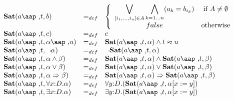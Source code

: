 \documentclass{article}
\def\dbigwedge{\mathop{\displaystyle \bigwedge }}%
\def\dbigvee{\mathop{\displaystyle \bigvee }}%
\begin{document}
\begin{equation*}
\begin{array}{lll}
\mathbf{Sat}(a \mbox{\aap ,} t, b) & =_{def} & \left\{
\begin{array}{cc}
\dbigvee\limits_{\lbrack i_{1},\ldots ,i_{n}]\in
A}\dbigwedge\limits_{k=1\ldots n}(a_{k}=b_{i_{k}}) & \text{if }A\neq
\emptyset \\
false & \text{otherwise}%
\end{array}%
\right. \\
\mathbf{Sat}(a \mbox{\aap ,} t, c) & =_{def} & c \\
\mathbf{Sat}(a \mbox{\aap ,} t, \alpha \mbox{\aap ,} u) & =_{def} & \mathbf{%
Sat}(a \mbox{\aap ,} t, \alpha) \wedge t \approx u \\
\mathbf{Sat}(a \mbox{\aap ,} t, \neg \alpha) & =_{def} & \neg \mathbf{Sat}(a %
\mbox{\aap ,} t, \alpha) \\
\mathbf{Sat}(a \mbox{\aap ,} t, \alpha \wedge \beta) & =_{def} & \mathbf{Sat}%
(a \mbox{\aap ,} t, \alpha) \wedge \mathbf{Sat}(a \mbox{\aap ,} t, \beta) \\
\mathbf{Sat}(a \mbox{\aap ,} t, \alpha \vee \beta) & =_{def} & \mathbf{Sat}%
(a \mbox{\aap ,} t, \alpha) \vee \mathbf{Sat}(a \mbox{\aap ,} t, \beta) \\
\mathbf{Sat}(a \mbox{\aap ,} t, \alpha \Rightarrow \beta) & =_{def} &
\mathbf{Sat}(a \mbox{\aap ,} t, \alpha) \Rightarrow \mathbf{Sat}(a %
\mbox{\aap ,} t, \beta) \\
\mathbf{Sat}(a \mbox{\aap ,} t, \forall{x {:} D}. \alpha) & =_{def} & \forall%
{y {:} D}. (\mathbf{Sat}(a \mbox{\aap ,} t, \alpha[x := y]) \\
\mathbf{Sat}(a \mbox{\aap ,} t, \exists{x {:} D}. \alpha) & =_{def} & \exists%
{y {:} D}. (\mathbf{Sat}(a \mbox{\aap ,} t, \alpha[x := y]) \\
&  &
\end{array}%
\end{equation*}

\end{document}

